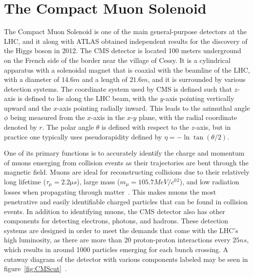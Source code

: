 \section{The Compact Muon Solenoid}
\label{sec:CMS}

The Compact Muon Solenoid is one of the main general-purpose detectors at the LHC, and it along with ATLAS obtained independent results for the discovery of the Higgs boson in 2012.
The CMS detector is located 100 meters underground on the French side of the border near the village of Cessy.
It is a cylindrical apparatus with a solenoidal magnet that is coaxial with the beamline of the LHC, with a diameter of $14.6\unit{m}$ and a length of $21.6\unit{m}$, and it is surrounded by various detection systems.
The coordinate system used by CMS is defined such that $z$-axis is defined to lie along the LHC beam, with the $y$-axis pointing vertically upward and the $x$-axis pointing radially inward.
This leads to the azimuthal angle $\phi$ being measured from the $x$-axis in the $x$-$y$ plane, with the radial coordinate denoted by $r$.
The polar angle $\theta$ is defined with respect to the $z$-axis, but in practice one typically uses pseudorapidity defined by $\eta=-\ln\tan(\theta/2)$.

One of its primary functions is to accurately identify the charge and momentum of muons emerging from collision events as their trajectories are bent through the magnetic field.
Muons are ideal for reconstructing collisions due to their relatively long lifetime ($\tau_\mu=2.2\unit{\micro s}$), large mass ($m_\mu=105.7\unit{MeV/\clight^2}$), and low radiation losses when propagating through matter~\cite{peskin2019}.
This makes muons the most penetrative and easily identifiable charged particles that can be found in collision events. %
In addition to identifying muons, the CMS detector also has other components for detecting electrons, photons, and hadrons.
These detection systems are designed in order to meet the demands that come with the LHC's high luminosity, as there are more than 20 proton-proton interactions every $25\unit{ns}$, which results in around 1000 particles emerging for each bunch crossing. %
A cutaway diagram of the detector with various components labeled may be seen in figure~\ref{fig:CMScut}~\cite{Sakuma:2665537}.

